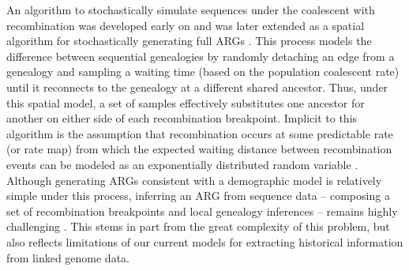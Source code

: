 \documentclass[11pt]{article}
\begin{document}
An algorithm to stochastically simulate sequences under the coalescent with 
recombination was developed early on \citep{hudson1983properties} 
and was later extended as a spatial algorithm for stochastically generating full 
ARGs \citep{wiuf_recombination_1999}. 
This process models the difference between sequential genealogies by 
randomly detaching an edge from a genealogy and sampling
a waiting time (based on the population coalescent rate) until it reconnects
to the genealogy at a different shared ancestor.
Thus, under this spatial model, a set of samples effectively substitutes
one ancestor for another on either side of each recombination breakpoint.
Implicit to this algorithm is the assumption that recombination 
occurs at some predictable rate (or rate map) from which the expected 
waiting distance between recombination events can be modeled as an 
exponentially distributed random variable \citep{wiuf_recombination_1999}.
Although generating ARGs consistent with a demographic model is 
relatively simple under this process, inferring an ARG from sequence data 
-- composing a set of recombination breakpoints and local genealogy inferences -- 
remains highly challenging \citep{y_c_brandt_evaluation_2022}.
This stems in part from the great complexity of this problem, 
but also reflects limitations of our current models for 
extracting historical information from linked genome data.
\end{document}
